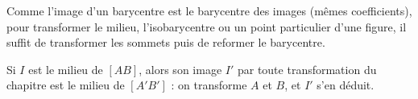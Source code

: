 Comme l'image d'un barycentre est le barycentre des images (mêmes coefficients), pour
transformer le milieu, l'isobarycentre ou un point particulier d'une figure, il
suffit de transformer les sommets puis de reformer le barycentre.
\begin{exemple}
Si $I$ est le milieu de $[AB]$, alors son image $I'$ par toute transformation du
chapitre est le milieu de $[A'B']$ : on transforme $A$ et $B$, et $I'$ s'en déduit.
\end{exemple}

